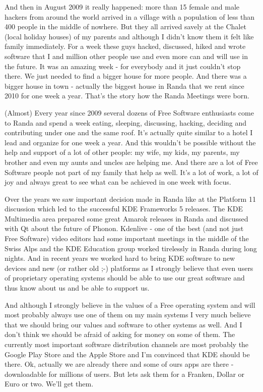 And then in August 2009 it really happened: more than 15 female and male hackers from around the world arrived in a village with a population of less than 400 people in the middle of nowhere. But they all arrived savely at the Chalet (local holiday houses) of my parents and although I didn't know them it felt like family immediately. For a week these guys hacked, discussed, hiked and wrote software that I and million other people use and even more can and will use in the future. It was an amazing week - for everybody and it just couldn't stop there. We just needed to find a bigger house for more people. And there was a bigger house in town - actually the biggest house in Randa that we rent since 2010 for one week a year. That's the story how the Randa Meetings were born.

(Almost) Every year since 2009 several dozens of Free Software enthusiasts come to Randa and spend a week eating, sleeping, discussing, hacking, deciding and contributing under one and the same roof. It's actually quite similar to a hotel I lead and organize for one week a year. And this wouldn't be possible without the help and support of a lot of other people: my wife, my kids, my parents, my brother and even my aunts and uncles are helping me. And there are a lot of Free Software people not part of my family that help as well. It's a lot of work, a lot of joy and always great to see what can be achieved in one week with focus.

Over the years we saw important decision made in Randa like at the Platform 11 discussion which led to the successful KDE Frameworks 5 releases. The KDE Multimedia area prepared some great Amarok releases in Randa and discussed with Qt about the future of Phonon. Kdenlive - one of the best (and not just Free Software) video editors had some important meetings in the middle of the Swiss Alps and the KDE Education group worked tirelessly in Randa during long nights. And in recent years we worked hard to bring KDE software to new devices and new (or rather old ;-) platforms as I strongly believe that even users of proprietary operating systems should be able to use our great software and thus know about us and be able to support us.

And although I strongly believe in the values of a Free operating system and will most probably always use one of them on my main systems I very much believe that we should bring our values and software to other systems as well. And I don't think we should be afraid of asking for money on some of them. The currently most important software distribution channels are most probably the Google Play Store and the Apple Store and I'm convinced that KDE should be there. Ok, actually we are already there and some of ours apps are there - downloadable for millions of users. But lets ask them for a Franken, Dollar or Euro or two. We'll get them.

